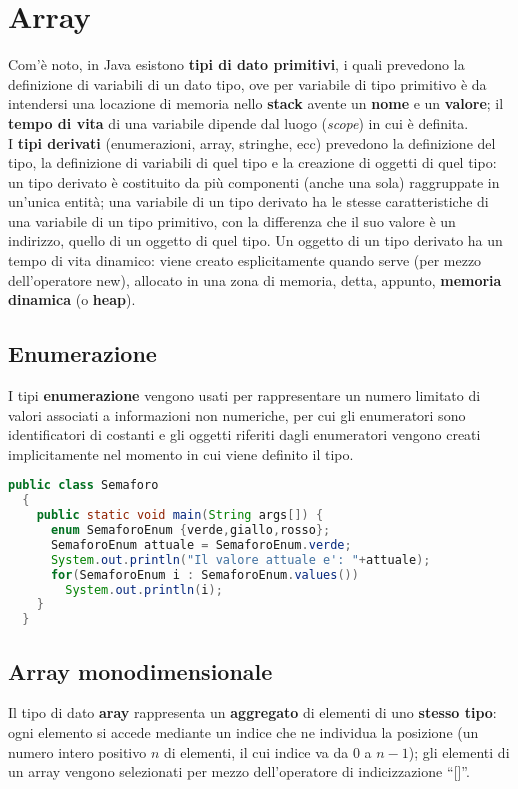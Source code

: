 \documentclass[a4paper]{extarticle}
\newcommand{\quotes}[1]{``#1''}
\begin{document}
\section{Array}
Com'è noto, in Java esistono \textbf{tipi di dato primitivi}, i quali prevedono la definizione di variabili di un dato tipo, ove per variabile di tipo primitivo è da intendersi una locazione di memoria nello \textbf{stack} avente un \textbf{nome} e un \textbf{valore}; il \textbf{tempo di vita} di una variabile dipende dal luogo (\emph{scope}) in cui è definita.\\
I \textbf{tipi derivati} (enumerazioni, array, stringhe, ecc) prevedono la definizione del tipo, la definizione di variabili di quel tipo e la creazione di oggetti di quel tipo: un tipo derivato è costituito da più componenti (anche una sola) raggruppate in un’unica entità; una variabile di un tipo derivato ha le stesse caratteristiche di una variabile di un tipo primitivo, con la differenza che il suo valore è un indirizzo, quello di un oggetto di quel tipo. Un oggetto di un tipo derivato ha un tempo di vita dinamico: viene creato esplicitamente quando serve (per mezzo dell’operatore new), allocato in una zona di memoria, detta, appunto, \textbf{memoria dinamica} (o \textbf{heap}).

\vspace{1em}
\subsection{Enumerazione}
I tipi \textbf{enumerazione} vengono usati per rappresentare un numero limitato di valori associati a informazioni non numeriche, per cui gli enumeratori sono identificatori di costanti e gli oggetti riferiti dagli enumeratori vengono creati implicitamente nel momento in cui viene definito il tipo.

\vspace{1em}
\noindent
\begin{lstlisting}[language=Java, caption=Enumerazione in Java]
  public class Semaforo
  {
    public static void main(String args[]) {
      enum SemaforoEnum {verde,giallo,rosso};
      SemaforoEnum attuale = SemaforoEnum.verde;
      System.out.println("Il valore attuale e': "+attuale);
      for(SemaforoEnum i : SemaforoEnum.values())
        System.out.println(i);
    }
  }
\end{lstlisting}

\vspace{1em}
\subsection{Array monodimensionale}
Il tipo di dato \textbf{aray} rappresenta un \textbf{aggregato} di elementi di uno \textbf{stesso tipo}: ogni elemento si accede mediante un indice che ne individua la posizione (un numero intero positivo $n$ di elementi, il cui indice va da $0$ a $n-1$); gli elementi di un array vengono selezionati per mezzo dell’operatore di indicizzazione \quotes{[]}.
\end{document}
